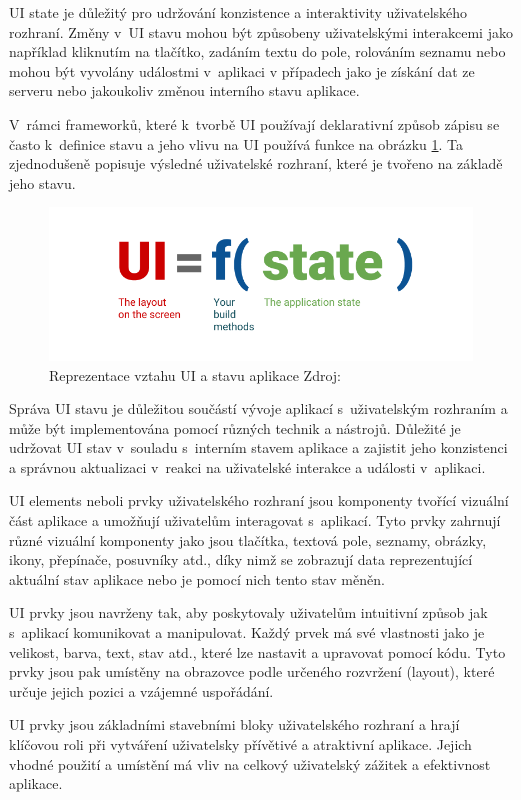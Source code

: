 UI state je důležitý pro udržování konzistence a interaktivity uživatelského rozhraní. Změny v~UI stavu mohou být způsobeny uživatelskými
interakcemi jako například kliknutím na tlačítko, zadáním textu do pole, rolováním seznamu nebo mohou být vyvolány událostmi v~aplikaci v případech 
jako je získání dat ze serveru nebo jakoukoliv změnou interního stavu aplikace. 

V~rámci frameworků, které k~tvorbě UI používají deklarativní způsob zápisu se často k~definice stavu a jeho vlivu na UI používá funkce 
na obrázku \ref{fig:UI_function}. Ta zjednodušeně popisuje výsledné uživatelské rozhraní, které je tvořeno na základě jeho stavu.

\begin{figure}[H]
  \centering
  \includegraphics[width=.5\textwidth]{ui-equals-function-of-state.png}
  \caption{Reprezentace vztahu UI a stavu aplikace Zdroj: \cite{imgUIformula}}
  \label{fig:UI_function}
\end{figure}

Správa UI stavu je důležitou součástí vývoje aplikací s~uživatelským rozhraním a může být implementována pomocí různých technik a nástrojů.
Důležité je udržovat UI stav v~souladu s~interním stavem aplikace a zajistit jeho konzistenci a správnou aktualizaci v~reakci na uživatelské 
interakce a události v~aplikaci.

UI elements neboli prvky uživatelského rozhraní jsou komponenty tvořící vizuální část aplikace a umožňují uživatelům interagovat s~aplikací. \cite{andDocArch}
Tyto prvky zahrnují různé vizuální komponenty jako jsou tlačítka, textová pole, seznamy, obrázky, ikony, přepínače, posuvníky atd., díky nimž
se zobrazují data reprezentující aktuální stav aplikace nebo je pomocí nich tento stav měněn.

UI prvky jsou navrženy tak, aby poskytovaly uživatelům intuitivní způsob jak s~aplikací komunikovat a manipulovat. Každý prvek má své 
vlastnosti jako je velikost, barva, text, stav atd., které lze nastavit a upravovat pomocí kódu. Tyto prvky jsou pak umístěny na obrazovce 
podle určeného rozvržení (layout), které určuje jejich pozici a vzájemné uspořádání.

UI prvky jsou základními stavebními bloky uživatelského rozhraní a hrají klíčovou roli při vytváření uživatelsky přívětivé a atraktivní aplikace. 
Jejich vhodné použití a umístění má vliv na celkový uživatelský zážitek a efektivnost aplikace.

